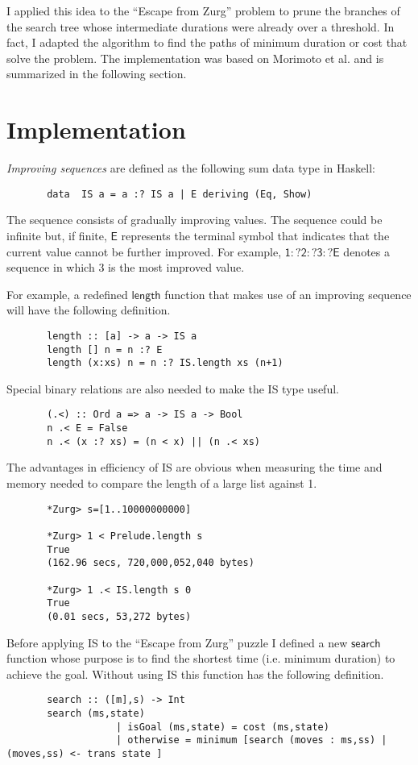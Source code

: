 \documentclass[journal,onecolumn,12pt]{IEEEtran}
\begin{document}
I applied this idea to the ``Escape from Zurg'' problem to prune the branches of the search tree whose intermediate durations were already over a threshold.  In fact, I adapted the algorithm to find the paths of minimum duration or cost that solve the problem.  The implementation was based on Morimoto et al. \cite{morimoto} and is summarized in the following section.


\section{Implementation}
\textit{Improving sequences} are defined as the following sum data type in Haskell:
\begin{lstlisting}
       data  IS a = a :? IS a | E deriving (Eq, Show)
\end{lstlisting}

The sequence consists of gradually improving values.  The sequence could be infinite but, if finite, $\mathsf{E}$ represents the terminal symbol that indicates that the current value cannot be further improved.  For example, $\mathsf{1 :? 2 :? 3 :? E}$ denotes a sequence in which $3$ is the most improved value.

For example, a redefined $\mathsf{length}$ function that makes use of an improving sequence will have the following definition.
\begin{lstlisting}
       length :: [a] -> a -> IS a
       length [] n = n :? E
       length (x:xs) n = n :? IS.length xs (n+1)
\end{lstlisting}

Special binary relations are also needed to make the IS type useful. 
\begin{lstlisting}
       (.<) :: Ord a => a -> IS a -> Bool
       n .< E = False
       n .< (x :? xs) = (n < x) || (n .< xs)
\end{lstlisting}

The advantages in efficiency of IS are obvious when measuring the time and memory needed to compare the length of a large list against 1.
\begin{lstlisting}
       *Zurg> s=[1..10000000000]
       
       *Zurg> 1 < Prelude.length s
       True
       (162.96 secs, 720,000,052,040 bytes)
       
       *Zurg> 1 .< IS.length s 0  
       True
       (0.01 secs, 53,272 bytes)
\end{lstlisting}

Before applying IS to the ``Escape from Zurg'' puzzle I defined a new $\mathsf{search}$ function whose purpose is to find the shortest time (i.e. minimum duration) to achieve the goal.  Without using IS this function has the following definition.
\begin{lstlisting}
       search :: ([m],s) -> Int
       search (ms,state)
                   | isGoal (ms,state) = cost (ms,state)
                   | otherwise = minimum [search (moves : ms,ss) | (moves,ss) <- trans state ]
\end{lstlisting}
\end{document}

